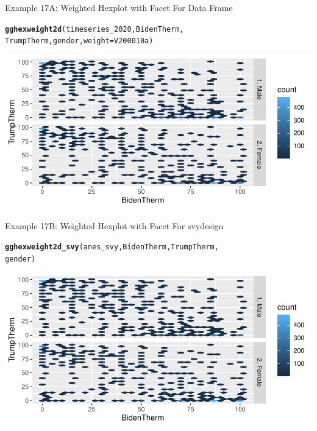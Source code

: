 \documentclass{beamer}\usepackage[]{graphicx}\usepackage[]{color}
\makeatletter
\newcommand{\hlstd}[1]{\textcolor[rgb]{0.345,0.345,0.345}{#1}}%
\newcommand{\hlkwc}[1]{\textcolor[rgb]{0.333,0.667,0.333}{#1}}%
\newcommand{\hlkwd}[1]{\textcolor[rgb]{0.737,0.353,0.396}{\textbf{#1}}}%
\newenvironment{kframe}{%
 \def\at@end@of@kframe{}%
 \ifinner\ifhmode%
  \def\at@end@of@kframe{\end{minipage}}%
  \begin{minipage}{\columnwidth}%
 \fi\fi%
 \def\FrameCommand##1{\hskip\@totalleftmargin \hskip-\fboxsep
 \colorbox{shadecolor}{##1}\hskip-\fboxsep
     \hskip-\linewidth \hskip-\@totalleftmargin \hskip\columnwidth}%
 \MakeFramed {\advance\hsize-\width
   \@totalleftmargin\z@ \linewidth\hsize
   \@setminipage}}%
 {\par\unskip\endMakeFramed%
 \at@end@of@kframe}
\newenvironment{knitrout}{}{} %
\makeatother
\begin{document}
\begin{frame}[fragile]{Example 17A: Weighted Hexplot with Facet For Data Frame}
\begin{knitrout}
\color{fgcolor}\begin{kframe}
\begin{alltt}
\hlkwd{gghexweight2d}\hlstd{(timeseries_2020, BidenTherm,}
    \hlstd{TrumpTherm, gender,} \hlkwc{weight} \hlstd{= V200010a)}
\end{alltt}
\end{kframe}
\includegraphics[width=0.95\linewidth]{figure/unnamed-chunk-65-1} 
\end{knitrout}

\end{frame}


\begin{frame}[fragile]{Example 17B: Weighted Hexplot with Facet For svydesign}

\begin{knitrout}
\color{fgcolor}\begin{kframe}
\begin{alltt}
\hlkwd{gghexweight2d_svy}\hlstd{(anes_svy, BidenTherm, TrumpTherm,}
    \hlstd{gender)}
\end{alltt}
\end{kframe}
\includegraphics[width=0.95\linewidth]{figure/unnamed-chunk-66-1} 
\end{knitrout}

\end{frame}
\end{document}
